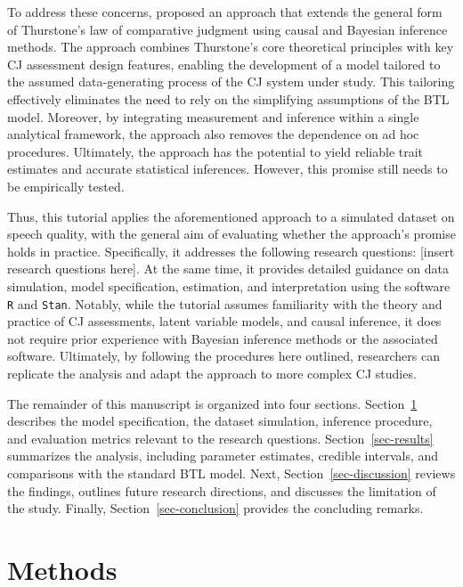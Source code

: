 \documentclass[
  authoryear,
  review,
  1p]{elsarticle}
\begin{document}
To address these concerns, \citet{Rivera_et_al_2025} proposed an
approach that extends the general form of Thurstone's law of comparative
judgment \citep{Thurstone_1927a, Thurstone_1927b} using causal and
Bayesian inference methods. The approach combines Thurstone's core
theoretical principles with key CJ assessment design features, enabling
the development of a model tailored to the assumed data-generating
process of the CJ system under study. This tailoring effectively
eliminates the need to rely on the simplifying assumptions of the BTL
model. Moreover, by integrating measurement and inference within a
single analytical framework, the approach also removes the dependence on
ad hoc procedures. Ultimately, the approach has the potential to yield
reliable trait estimates and accurate statistical inferences. However,
this promise still needs to be empirically tested.

Thus, this tutorial applies the aforementioned approach to a simulated
dataset on speech quality, with the general aim of evaluating whether
the approach's promise holds in practice. Specifically, it addresses the
following research questions: {{[}insert research questions here{]}}. At
the same time, it provides detailed guidance on data simulation, model
specification, estimation, and interpretation using the software
\texttt{R} and \texttt{Stan}. Notably, while the tutorial assumes
familiarity with the theory and practice of CJ assessments, latent
variable models, and causal inference, it does not require prior
experience with Bayesian inference methods or the associated software.
Ultimately, by following the procedures here outlined, researchers can
replicate the analysis and adapt the approach to more complex CJ
studies.

The remainder of this manuscript is organized into four sections.
Section~\ref{sec-methods} describes the model specification, the dataset
simulation, inference procedure, and evaluation metrics relevant to the
research questions. Section~\ref{sec-results} summarizes the analysis,
including parameter estimates, credible intervals, and comparisons with
the standard BTL model. Next, Section~\ref{sec-discussion} reviews the
findings, outlines future research directions, and discusses the
limitation of the study. Finally, Section~\ref{sec-conclusion} provides
the concluding remarks.

\section{Methods}\label{sec-methods}
\end{document}
